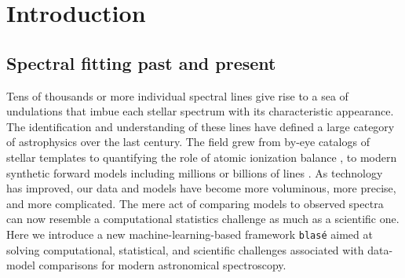 \documentclass[twocolumn]{aastex631}
\begin{document}

\section{Introduction}\label{sec:intro}

\subsection{Spectral fitting past and present}

Tens of thousands or more individual spectral lines give rise to a sea of undulations that imbue each stellar spectrum with its characteristic appearance.  The identification and understanding of these lines have defined a large category of astrophysics over the last century.  The field grew from by-eye catalogs of stellar templates \citep{1901AnHar..28..129C} to quantifying the role of atomic ionization balance \citep{1925PhDT.........1P}, to modern synthetic forward models including millions or billions of lines \citep[\emph{e.g.}][]{husser13, 2021ApJ...920...85M, 2021JQSRT.26107476V}.  As technology has improved, our data and models have become more voluminous, more precise, and more complicated.  The mere act of comparing models to observed spectra can now resemble a computational statistics challenge as much as a scientific one.  Here we introduce a new machine-learning-based framework \texttt{blas\'e} aimed at solving computational, statistical, and scientific challenges associated with data-model comparisons for modern astronomical spectroscopy.
\end{document}
